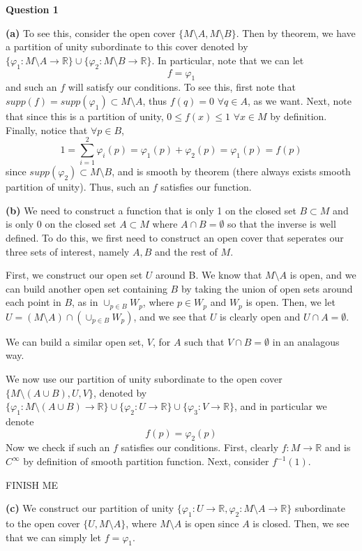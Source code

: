 \documentclass[10pt]{article}
\newcommand{\R}{\mathbb{R}}
\begin{document}
\textbf{Question 1}

\textbf{(a)} To see this, consider the open cover $\{M\setminus A,M \setminus B\}$. Then by theorem, we have a partition of unity subordinate to this cover denoted by $\{\varphi_{1}:M\setminus A \to \R\}\cup\{\varphi_{2}:M\setminus B\to \R\}$. In particular, note that we can let
$$f = \varphi_{1}$$
and such an $f$ will satisfy our conditions. To see this, first note that $supp(f) = supp(\varphi_{1})\subset M\setminus A$, thus $f(q) = 0$ $\forall q \in A$, as we want. Next, note that since this is a partition of unity, $0 \leq f(x) \leq 1$ $\forall x \in M$ by definition. Finally, notice that $\forall p\in B$,
$$1 = \sum_{i=1}^{2}\varphi_{i}(p) = \varphi_{1}(p) + \varphi_{2}(p) = \varphi_{1}(p) = f(p)$$
since $supp(\varphi_{2}) \subset M\setminus B$, and is smooth by theorem (there always exists smooth partition of unity). Thus, such an $f$ satisfies our function.

\textbf{(b)} We need to construct a function that is only 1 on the closed set $B\subset M$ and is only 0 on the closed set $A\subset M$ where $A\cap B = \emptyset$ so that the inverse is well defined. To do this, we first need to construct an open cover that seperates our three sets of interest, namely $A, B$ and the rest of $M$.

First, we construct our open set $U$ around B. We know that $M\setminus A$ is open, and we can build another open set containing $B$ by taking the union of open sets around each point in $B$, as in $\cup_{p\in B}W_{p}$, where $p\in W_{p}$ and $W_{p}$ is open. Then, we let $U = (M\setminus A)\cap(\cup_{p\in B}W_{p})$, and we see that $U$ is clearly open and $U \cap A = \emptyset$.

We can build a similar open set, $V$, for $A$ such that $V\cap B = \emptyset$ in an analagous way.

We now use our partition of unity subordinate to the open cover $\{M\setminus (A\cup B),U,V\}$, denoted by $\{\varphi_{1}:M\setminus (A\cup B) \to \R\}\cup\{\varphi_{2}:U \to \R\}\cup\{\varphi_{3}:V\to \R\}$, and in particular we denote
$$f(p) = \varphi_{2}(p)$$
Now we check if such an $f$ satisfies our conditions. First, clearly $f: M \to \R$ and is $C^{\infty}$ by definition of smooth partition function. Next, consider $f^{-1}(1)$.

FINISH ME

\textbf{(c)} We construct our partition of unity $\{\varphi_{1}: U \to \R,\varphi_{2}: M\setminus A \to \R\}$ subordinate to the open cover $\{U,M\setminus A\}$, where $M\setminus A$ is open since $A$ is closed. Then, we see that we can simply let $f = \varphi_{1}$.
\end{document}

